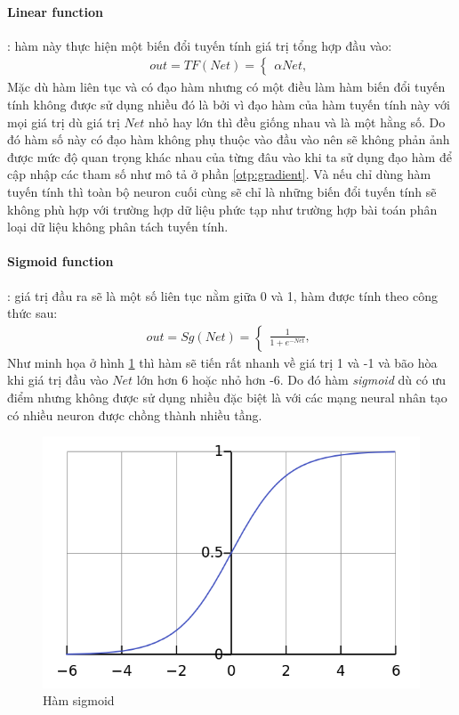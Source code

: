 \documentclass[fontsize=12pt]{scrartcl}
\begin{document}
\paragraph*{Linear function}: hàm này thực hiện một biến đổi tuyến tính giá trị tổng hợp đầu vào:
\begin{align}
out = TF(Net) = \begin{cases}
                  \alpha Net,
    			\end{cases}
\end{align}
Mặc dù hàm liên tục và có đạo hàm nhưng có một điều làm hàm biến đổi tuyến tính không được sử dụng nhiều đó là bởi vì đạo hàm của hàm tuyến tính này với mọi giá trị dù giá trị $Net$ nhỏ hay lớn thì đều giống nhau và là một hằng số. Do đó hàm số này có đạo hàm không phụ thuộc vào đầu vào nên sẽ không phản ảnh được mức độ quan trọng khác nhau của từng đâu vào khi ta sử dụng đạo hàm để cập nhập các tham số như mô tả ở phần \ref{otp:gradient}. Và nếu chỉ dùng hàm tuyến tính thì toàn bộ neuron cuối cùng sẽ chỉ là những biến đổi tuyến tính sẽ không phù hợp với trường hợp dữ liệu phức tạp như trường hợp bài toán phân loại dữ liệu không phân tách tuyến tính.
\paragraph*{Sigmoid function}: giá trị đầu ra sẽ là một số liên tục nằm giữa 0 và 1, hàm được tính theo công thức sau:
\begin{align}
out = Sg(Net) = \begin{cases}
                  \frac{1}{1+e^{-Net}},
    			\end{cases}
\end{align}
Như minh họa ở hình \ref{fig:sigmoid} thì hàm sẽ tiến rất nhanh về giá trị 1 và -1 và bão hòa khi giá trị đầu vào $Net$ lớn hơn 6 hoặc nhỏ hơn -6. Do đó hàm \textit{sigmoid} dù có ưu điểm nhưng không được sử dụng nhiều đặc biệt là với các mạng neural nhân  tạo có nhiều neuron được chồng thành nhiều tầng.
\begin{figure}
     \includegraphics[width=\textwidth]{img/sigmoid_}
      \caption{Hàm sigmoid}
       \label{fig:sigmoid}
\end{figure}
\end{document}

